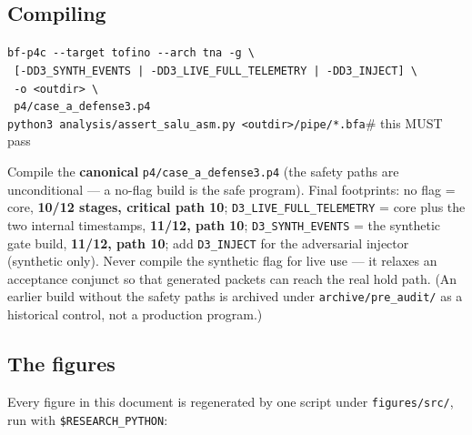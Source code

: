\documentclass[10pt,a4paper,oneside]{article}
\newcommand{\code}[1]{\texttt{\small #1}}
\begin{document}
\subsection{Compiling}

\begin{center}\small
\begin{minipage}{0.86\textwidth}
\code{bf-p4c -{}-target tofino -{}-arch tna -g \textbackslash}\\
\code{\quad\ [-DD3\_SYNTH\_EVENTS | -DD3\_LIVE\_FULL\_TELEMETRY | -DD3\_INJECT] \textbackslash}\\
\code{\quad\ -o <outdir> \textbackslash}\\
\code{\quad\ p4/case\_a\_defense3.p4}\\
\code{python3 analysis/assert\_salu\_asm.py <outdir>/pipe/*.bfa}\quad\# this MUST pass
\end{minipage}
\end{center}

Compile the \textbf{canonical} \code{p4/case\_a\_defense3.p4} (the safety paths are
unconditional --- a no-flag build is the safe program). Final footprints: no flag = core, \textbf{10/12
stages, critical path 10}; \code{D3\_LIVE\_FULL\_TELEMETRY} = core plus the two internal
timestamps, \textbf{11/12, path 10}; \code{D3\_SYNTH\_EVENTS} = the synthetic gate build,
\textbf{11/12, path 10}; add \code{D3\_INJECT} for the adversarial injector (synthetic only).
Never compile the synthetic flag for live use --- it relaxes an acceptance conjunct so that
generated packets can reach the real hold path. (An earlier build without the safety paths is
archived under \code{archive/pre\_audit/} as a historical control, not a production program.)

\subsection{The figures}

Every figure in this document is regenerated by one script under \code{figures/src/}, run
with \code{\$RESEARCH\_PYTHON}:
\end{document}
